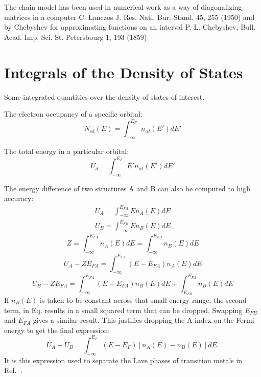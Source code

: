 The chain model has been used in numerical work as a way of diagonalizing matrices in a computer 
C. Lanczos J. Res. Natl. Bur. Stand. 45, 255 (1950) and
by Chebyshev for approximating functions on an interval
P. L. Chebyshev, Bull. Acad. Imp. Sci. St. Petersbourg 1, 193 (1859)


\section{Integrals of the Density of States}
%
Some integrated quantities over the density of states of interest.

The electron occupancy of a specific orbital:
%
\begin{equation}
N_{\alpha l}(E) = \int_{-\infty}^{E_{F}} n_{\alpha l}(E') dE'
\end{equation}
%

The total energy in a particular orbital:
%
\begin{equation}
U_{d} = \int_{-\infty}^{E_{F}}E'n_{\alpha l}(E') dE'
\end{equation}
%

The energy difference of two structures A and B can also be computed
to high accuracy:
%
\begin{eqnarray}
\label{eq:Ua}
U_{A} = \int_{-\infty}^{E_{FA}} E n_{A}(E) dE
\end{eqnarray}
%
\begin{eqnarray}
\label{eq:Ub}
U_{B} = \int_{-\infty}^{E_{FB}} E n_{B}(E) dE
\end{eqnarray}
%
\begin{equation}
\label{eq:totaldos}
Z = \int_{-\infty}^{E_{FA}} n_{A}(E)dE = \int_{-\infty}^{E_{FB}}n_{B}(E)dE
\end{equation}
%
\begin{equation}
U_{A}-ZE_{FA}= \int_{-\infty}^{E_{FA}}(E-E_{FA})n_{A}(E)dE
\end{equation}
%
\begin{equation}
U_{B}-ZE_{FA}= \int_{-\infty}^{E_{FA}}(E-E_{FA})n_{B}(E)dE + \int_{E_{FB}}^{E_{FA}}n_{B}(E)dE
\end{equation}
%
If $n_{B}(E)$ is taken to be constant across that small energy range, the second term, in
Eq. results in a small squared term that can be dropped. Swapping $E_{FB}$ and $E_{FA}$ gives
a similar result. This justifies dropping the A index on the Fermi energy to get the
final expression:
%
\begin{equation}
U_{A}-U_{B} = \int_{-\infty}^{E_{F}}(E-E_{F})[n_{A}(E) -n_{B}(E)]dE.
\end{equation}
%
It is this expression used to separate the Lave phases of transition metals in Ref.~\cite{haydock76}.

